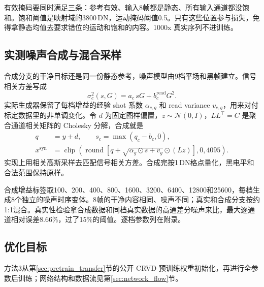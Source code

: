 \documentclass[11pt,a4paper,UTF8,fontset=fandol]{ctexart}
\newcommand{\dn}{\ensuremath{\,\mathrm{DN}}}
\begin{document}
有效掩码要同时满足三条：参考有效、输入8帧都是静态、所有输入通道都没饱和。饱和阈值是映射域的3800\dn，运动掩码阈值0.5。只有这些位置参与损失，免得拿静态均值去要求错位的运动和饱和的内容。1000x 真实序列不进训练。

\subsection{实测噪声合成与混合采样}

合成分支的干净目标还是同一份静态参考，噪声模型由9档平场和黑帧建立。信号相关方差写成
\begin{equation}
 \sigma_c^2(s,G)=a_c\,sG+b_c^{\mathrm{read}}G^2.
\end{equation}
实际生成器保留了每档增益的经验 shot 系数 $\alpha_{c,g}$ 和 read variance $v_{c,g}$，用来对付标定数据里的非单调变化。令 $d$ 为固定图样偏置，$z\sim\mathcal N(0,I)$，$LL^\top=C$ 是聚合通道相关矩阵的 Cholesky 分解，合成就是
\begin{align}
 q &= y+d,\qquad s_c=\max(q_c-b_c,0),\\
 x^{\mathrm{syn}} &= \operatorname{clip}\left(
 \operatorname{round}\left[q+\sqrt{\alpha_g\odot s+v_g}\odot(Lz)\right],0,4095\right).
 \label{eq:synthetic}
\end{align}
实现上用相关高斯采样去匹配信号相关方差。合成完按1\dn{}格点量化，黑电平和合法范围保持原样。

合成增益标签取100、200、400、800、1600、3200、6400、12800和25600，每档生成8个独立的噪声时序变体。8帧的干净内容相同、噪声不同；真实和合成分支按约1:1混合。真实性检验拿合成数据和同档真实数据的高通差分噪声来比，最大逐通道相对误差8.66\%，过了15\%的阈值。逐档参数列在附录。

\subsection{优化目标}

方法3从第\ref{sec:pretrain_transfer}节的公开 CRVD 预训练权重初始化，再进行全参数后训练；网络结构和数据流见第\ref{sec:network_flow}节。
\end{document}
